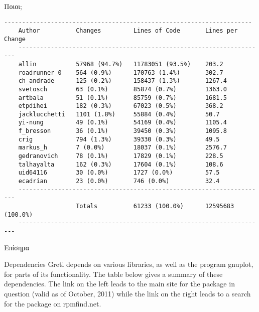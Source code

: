 \documentclass[xetex]{beamer}
\begin{document}
\begin{frame}[fragile]{Ποιοι;}
    \begin{Verbatim}[fontsize=\tiny]
    ---------------------------------------------------------------------
    Author          Changes         Lines of Code       Lines per Change
    ---------------------------------------------------------------------
    allin           57968 (94.7%)   11783051 (93.5%)    203.2
    roadrunner_0    564 (0.9%)      170763 (1.4%)       302.7
    ch_andrade      125 (0.2%)      158437 (1.3%)       1267.4
    svetosch        63 (0.1%)       85874 (0.7%)        1363.0
    artbala         51 (0.1%)       85759 (0.7%)        1681.5
    etpdihei        182 (0.3%)      67023 (0.5%)        368.2
    jacklucchetti   1101 (1.8%)     55884 (0.4%)        50.7
    yi-nung         49 (0.1%)       54169 (0.4%)        1105.4
    f_bresson       36 (0.1%)       39450 (0.3%)        1095.8
    crig            794 (1.3%)      39330 (0.3%)        49.5
    markus_h        7 (0.0%)        18037 (0.1%)        2576.7
    gedranovich     78 (0.1%)       17829 (0.1%)        228.5
    talhayalta      162 (0.3%)      17604 (0.1%)        108.6
    uid64116        30 (0.0%)       1727 (0.0%)         57.5
    ecadrian        23 (0.0%)       746 (0.0%)          32.4
    ---------------------------------------------------------------------
                    Totals          61233 (100.0%)      12595683 (100.0%)
    ---------------------------------------------------------------------
    \end{Verbatim}
\end{frame}

\begin{frame}{Επίσημα}
    \begin{block}{Dependencies}
    Gretl depends on various libraries, as well as the program gnuplot, for parts of its functionality. The table below gives a summary of these dependencies. The link on the left leads to the main site for the package in question (valid as of October, 2011) while the link on the right leads to a search for the package on rpmfind.net.
    \end{block}
\end{frame}
\end{document}
